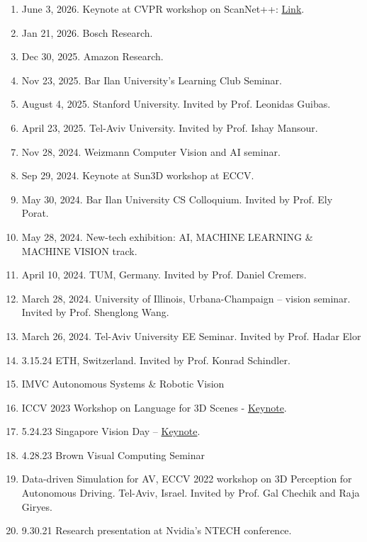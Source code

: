 \begin{enumerate}
    \item June 3, 2026. Keynote at CVPR workshop on ScanNet++: \href{https://scannetpp.mlsg.cit.tum.de/scannetpp/cvpr2026}{Link}.
    \item Jan 21, 2026. Bosch Research.
    \item Dec 30, 2025. Amazon Research.
    \item Nov 23, 2025. Bar Ilan University's Learning Club Seminar. 
    \item August 4, 2025. Stanford University. Invited by Prof. Leonidas Guibas.
    \item April 23, 2025. Tel-Aviv University. Invited by Prof. Ishay Mansour.
    \item Nov 28, 2024. Weizmann  Computer Vision and AI seminar.
    \item Sep 29, 2024. Keynote at Sun3D workshop at ECCV. 
    \item May 30, 2024. Bar Ilan University CS Colloquium. Invited by Prof. Ely Porat.
    \item May 28, 2024. New-tech exhibition: AI, MACHINE LEARNING \& MACHINE VISION track.
    \item April 10, 2024. TUM, Germany. Invited by Prof. Daniel Cremers. 
    \item March 28, 2024. University of Illinois, Urbana-Champaign -- vision seminar. Invited by Prof. Shenglong Wang.
    \item March 26, 2024. Tel-Aviv University EE Seminar. Invited by Prof. Hadar Elor
    \item 3.15.24 ETH, Switzerland. Invited by Prof. Konrad Schindler. 
    \item IMVC Autonomous Systems \& Robotic Vision
    \item ICCV 2023 Workshop on Language for 3D Scenes - \href{https://languagefor3dscenes.github.io/ICCV2023/#:~:text=shapes%20(3DHighlighter).-,Or%20Litany,-He%20is%20a}{Keynote}. 
    \item 5.24.23 Singapore Vision Day -- \href{https://www.comp.nus.edu.sg/~leegh/svd/#:~:text=Keynote%20Talk%203%3A%20Data%20driven%20simulation%20for%20AV%20(Or%20Litany%3B%20Nvidia%2C%20Incoming%20Technion)}{Keynote}.
    \item 4.28.23 Brown Visual Computing Seminar
    \item Data-driven Simulation for AV, ECCV 2022 workshop on 3D Perception for Autonomous Driving. Tel-Aviv, Israel. Invited by Prof. Gal Chechik and Raja Giryes.
    \item 9.30.21 Research presentation at Nvidia's NTECH conference. 

\end{enumerate}
